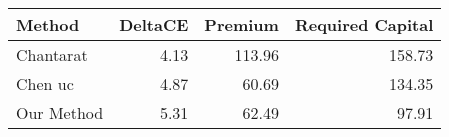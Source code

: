 \begin{tabular}{lrrr}
\toprule
Method & DeltaCE & Premium & Required Capital \\
\midrule
Chantarat & 4.13 & 113.96 & 158.73 \\
Chen uc & 4.87 & 60.69 & 134.35 \\
Our Method & 5.31 & 62.49 & 97.91 \\
\bottomrule
\end{tabular}
